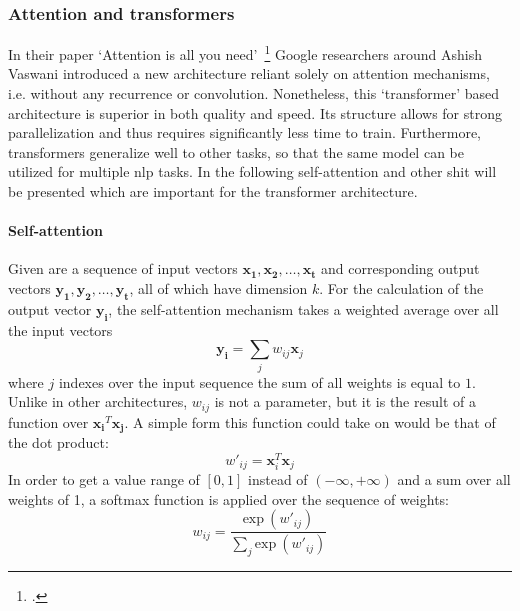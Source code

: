 \subsubsection{Attention and transformers}
\label{sub:attention_and_transformers}

In their paper `Attention is all you need'~\footcite{DBLP:journals/corr/VaswaniSPUJGKP17} Google researchers around Ashish Vaswani introduced a new architecture reliant solely on attention mechanisms, i.e. without any recurrence or convolution. Nonetheless, this `transformer' based architecture is superior in both quality and speed. Its structure allows for strong parallelization and thus requires significantly less time to train. Furthermore, transformers generalize well to other tasks, so that the same model can be utilized for multiple \gls{nlp} tasks.
In the following self-attention and other shit will be presented which are important for the transformer architecture.

\paragraph{Self-attention}
Given are a sequence of input vectors $ \boldsymbol{x_1}, \boldsymbol{x_2}, \dots, \boldsymbol{x_t} $ and corresponding output vectors $ \boldsymbol{y_1}, \boldsymbol{y_2}, \dots, \boldsymbol{y_t} $, all of which have dimension $ k $. For the calculation of the output vector $ \boldsymbol{y_i} $, the self-attention mechanism takes a weighted average over all the input vectors
\begin{equation}
	\boldsymbol{y_i} = \sum_j w_{ij} \boldsymbol{x}_j
\end{equation}
where $ j $ indexes over the input sequence the sum of all weights is equal to $ 1 $. Unlike in other architectures, $ w_{ij} $ is not a parameter, but it is the result of a function over $ \boldsymbol{x_i}^T \boldsymbol{x_j} $. A simple form this function could take on would be that of the dot product:
\begin{equation}
	w'_{ij} = \boldsymbol{x}_i^T \boldsymbol{x}_j
\end{equation}
In order to get a value range of $ [0, 1] $ instead of $ (-\infty, +\infty) $ and a sum over all weights of 1, a softmax function is applied over the sequence of weights:
\begin{equation}
	w_{ij} = \frac{\text{exp} \ (w'_{ij})}{\sum_j \text{exp} \ (w'_{ij})}
\end{equation}

